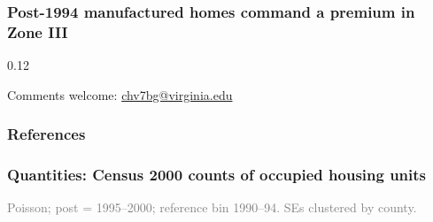 \documentclass[11pt,xcolor={dvipsnames},hyperref={pdftex,pdfpagemode=UseNone,hidelinks,pdfdisplaydoctitle=true},usepdftitle=false,aspectratio=169]{beamer}
\newcommand{\gc}[1]{{\footnotesize\textcolor{gray}{#1}}}
\begin{document}
\begin{frame}[t]\label{frame:price-static}
    \frametitle{Post-1994 manufactured homes command a premium in Zone III}
    \centering
    \vspace{-1em}

    \vspace{-.5em}
    \begin{overlayarea}{\linewidth}{0.12\textheight}
    \small
    \par\hfill \hyperlink{frame:price-ddd-es}{}
    \end{overlayarea}
\end{frame}

\begin{frame}

    \vspace{3em}

    \normalsize{Comments welcome:} \url{chv7bg@virginia.edu}
\end{frame}

\begin{frame}[allowframebreaks=0.8]
    \frametitle{References}
    \tiny{
    
    
    }
\end{frame}


\appendix


\begin{frame}\label{frame:census-quantity}
    \frametitle{Quantities: Census 2000 counts of occupied housing units}
    \vspace{-0.5em}
    \begin{table}
    \centering
    \resizebox*{!}{0.72\textheight}{}
    \end{table}

    \gc{Poisson; post = 1995--2000; reference bin 1990--94. SEs clustered by county.}
    \hfill \hyperlink{frame:quantity-static}{}
\end{frame}
\end{document}
